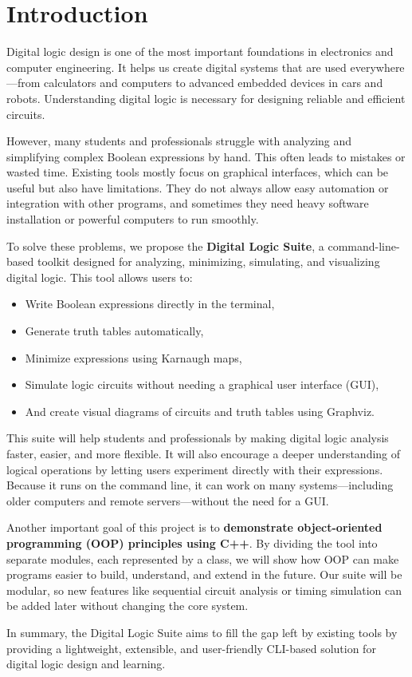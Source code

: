 \section{Introduction}

Digital logic design is one of the most important foundations in electronics and computer engineering. It helps us create digital systems that are used everywhere—from calculators and computers to advanced embedded devices in cars and robots. Understanding digital logic is necessary for designing reliable and efficient circuits.

However, many students and professionals struggle with analyzing and simplifying complex Boolean expressions by hand. This often leads to mistakes or wasted time. Existing tools mostly focus on graphical interfaces, which can be useful but also have limitations. They do not always allow easy automation or integration with other programs, and sometimes they need heavy software installation or powerful computers to run smoothly.

To solve these problems, we propose the \textbf{Digital Logic Suite}, a command-line-based toolkit designed for analyzing, minimizing, simulating, and visualizing digital logic. This tool allows users to:
\begin{itemize}
    \item Write Boolean expressions directly in the terminal,
    \item Generate truth tables automatically,
    \item Minimize expressions using Karnaugh maps,
    \item Simulate logic circuits without needing a graphical user interface (GUI),
    \item And create visual diagrams of circuits and truth tables using Graphviz.
\end{itemize}

This suite will help students and professionals by making digital logic analysis faster, easier, and more flexible. It will also encourage a deeper understanding of logical operations by letting users experiment directly with their expressions. Because it runs on the command line, it can work on many systems—including older computers and remote servers—without the need for a GUI.

Another important goal of this project is to \textbf{demonstrate object-oriented programming (OOP) principles using C++}. By dividing the tool into separate modules, each represented by a class, we will show how OOP can make programs easier to build, understand, and extend in the future. Our suite will be modular, so new features like sequential circuit analysis or timing simulation can be added later without changing the core system.

In summary, the Digital Logic Suite aims to fill the gap left by existing tools by providing a lightweight, extensible, and user-friendly CLI-based solution for digital logic design and learning.
